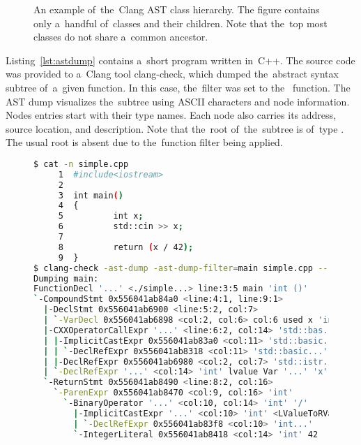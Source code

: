 \begin{figure}[ht]
\caption{An example of~the~Clang AST class hierarchy. 
The figure contains only a~handful of~classes and their children.
Note that the~top most classes do not share a~common ancestor.}
\label{dia:ast}
\end{figure}

Listing~\ref{lst:astdump} contains a~short program written in~C++.
The source code was provided to a~Clang tool clang-check, which
dumped the~abstract syntax subtree of~a~given function.
In this case, the~filter was set to the~ function.
The AST dump visualizes the~subtree using ASCII characters
and node information.
Nodes entries start with their type names. 
Each node also carries its address, source location, and description.
Note that the~root of~the~subtree is of~type .
The usual root  is absent due to the~function
filter being applied.

\begin{figure}[ht]\centering
\begin{lstlisting}[caption=Clang AST Dump., language=bash, 
label={lst:astdump}, basicstyle=\small, numbers=none]
$ cat -n simple.cpp
     1  #include<iostream>
     2
     3  int main()
     4  {
     5          int x;
     6          std::cin >> x;
     7
     8          return (x / 42);
     9  } 
$ clang-check -ast-dump -ast-dump-filter=main simple.cpp --
Dumping main:
FunctionDecl '...' <./simple...> line:3:5 main 'int ()'
`-CompoundStmt 0x556041ab84a0 <line:4:1, line:9:1>
  |-DeclStmt 0x556041ab6900 <line:5:2, col:7>
  | `-VarDecl 0x556041ab6898 <col:2, col:6> col:6 used x 'int'
  |-CXXOperatorCallExpr '...' <line:6:2, col:14> 'std::bas...'
  | |-ImplicitCastExpr 0x556041ab83a0 <col:11> 'std::basic...'
  | | `-DeclRefExpr 0x556041ab8318 <col:11> 'std::basic...'
  | |-DeclRefExpr 0x556041ab6980 <col:2, col:7> 'std::istr...'
  | `-DeclRefExpr '...' <col:14> 'int' lvalue Var '...' 'x'
  `-ReturnStmt 0x556041ab8490 <line:8:2, col:16>
    `-ParenExpr 0x556041ab8470 <col:9, col:16> 'int'
      `-BinaryOperator '...' <col:10, col:14> 'int' '/'
        |-ImplicitCastExpr '...' <col:10> 'int' <LValueToRValue>
        | `-DeclRefExpr 0x556041ab83f8 <col:10> 'int...'
        `-IntegerLiteral 0x556041ab8418 <col:14> 'int' 42
\end{lstlisting}
\end{figure}

